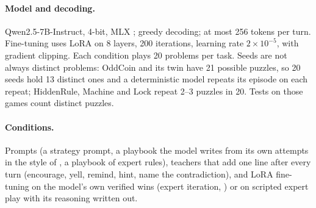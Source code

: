 \documentclass[11pt]{article}
\begin{document}
\begin{table}[h]
\centering\small
{}
\caption{Problems. Every verifier is exact; nothing in the environment calls a model.}
\label{tab:problems}
\end{table}

\paragraph{Model and decoding.} Qwen2.5-7B-Instruct, 4-bit, MLX \citep{qwen2024}; greedy decoding; at most 256
tokens per turn. Fine-tuning uses LoRA \citep{hu2022} on 8 layers, 200 iterations, learning rate $2\times10^{-5}$,
with gradient clipping. Each condition plays 20 problems per task. Seeds are not always distinct problems: OddCoin and its twin
have 21 possible puzzles, so 20 seeds hold 13 distinct ones and a deterministic model repeats its episode on each
repeat; HiddenRule, Machine and Lock repeat 2--3 puzzles in 20. Tests on those games count distinct puzzles.

\paragraph{Conditions.} Prompts (a strategy prompt, a playbook the model writes from its own attempts in the
style of \citet{shinn2023}, a playbook of expert rules), teachers that add one line after every turn (encourage,
yell, remind, hint, name the contradiction), and LoRA fine-tuning on the model's own verified wins (expert
iteration, \citealp{anthony2017,zelikman2022}) or on scripted expert play with its reasoning written out.
\end{document}
